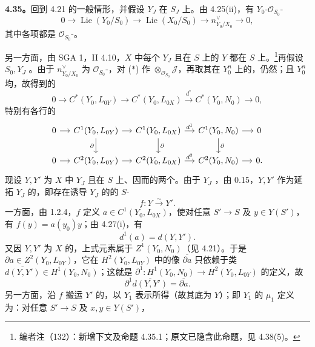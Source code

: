\textbf{4.35。}回到 4.21 的一般情形，并假设 $Y_J$ 在 $S_J$ 上。由 4.25(ii)，有 $Y_0$-$\mathscr O_{S_0}$-
\[0\longrightarrow\operatorname{Lie}(Y_0/S_0)\longrightarrow\operatorname{Lie}(X_0/S_0)\longrightarrow n_{Y_0/X_0}^\vee\longrightarrow0,\tag{$*$}\]
其中各项都是 $\mathscr O_{S_0}$-。

另一方面，由 SGA 1，II 4.10，$X$ 中每个 $Y_J$ 且在 $S$ 上的 $Y$ 都在 $S$ 上。\footnote{编者注（132）：新增下文及命题 4.35.1；原文已隐含此命题，见 4.38(5)。}再假设 $S_0,Y_J$ 。由于 $n_{Y_0/X_0}^\vee$ 为 $\mathscr O_{S_0}$-，对 ($*$) 作 $\otimes_{\mathscr O_{S_0}}\mathscr J$，再取其在 $Y_0^n$ 上的，仍然；且 $Y_0^n$ 均，故得到的
\[0\longrightarrow C^*(Y_0,L_{0Y})\longrightarrow C^*(Y_0,L_{0X})\xrightarrow{d^*}C^*(Y_0,N_0)\longrightarrow0,\]
特别有各行的
\[
\begin{tikzcd}[column sep=small]
0\arrow[r]&C^1(Y_0,L_{0Y})\arrow[r]\arrow[d,"\partial"']&C^1(Y_0,L_{0X})\arrow[r,"d^1"]\arrow[d,"\partial"]&C^1(Y_0,N_0)\arrow[r]\arrow[d,"\partial"]&0\\
0\arrow[r]&C^2(Y_0,L_{0Y})\arrow[r]&C^2(Y_0,L_{0X})\arrow[r,"d^2"]&C^2(Y_0,N_0)\arrow[r]&0.
\end{tikzcd}
\]
现设 $Y,Y'$ 为 $X$ 中 $Y_J$ 且在 $S$ 上、因而的两个。由于 $Y_J$ ，由 0.15，$Y,Y'$ 作为延拓 $Y_J$ 的，即存在诱导 $Y_J$ 的的 $S$-
\[f:Y\xrightarrow\sim Y'.\]
一方面，由 1.2.4，$f$ 定义 $a\in C^1(Y_0,L_{0X})$，使对任意 $S'\to S$ 及 $y\in Y(S')$，有 $f(y)=a(y_0)y$；由 4.27(i)，有
\[d^1(a)=d(Y,Y').\]
又因 $Y,Y'$ 为 $X$ 的，上式元素属于 $Z^1(Y_0,N_0)$（见 4.21）。于是 $\partial a\in Z^2(Y_0,L_{0Y})$，它在 $H^2(Y_0,L_{0Y})$ 中的像 $\overline{\partial a}$ 只依赖于类 $\overline{d(Y,Y')}\in H^1(Y_0,N_0)$；这就是 $\partial^1:H^1(Y_0,N_0)\to H^2(Y_0,L_{0Y})$ 的定义，故
\[\partial^1\overline{d(Y,Y')}=\overline{\partial a}.\]
另一方面，沿 $f$ 搬运 $Y'$ 的，以 $Y_1$ 表示所得（故其底为 $Y$）；即 $Y_1$ 的 $\mu_1$ 定义为：对任意 $S'\to S$ 及 $x,y\in Y(S')$，
